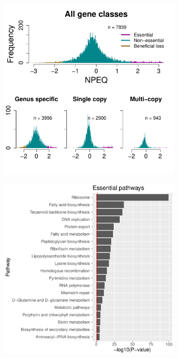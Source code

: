 \documentclass[12pt,letterpaper]{article}
\begin{document}
\begin{figure}
\captionsetup[subfigure]{justification=centering}
\begin{subfigure}{.5\textwidth}
  \centering
  \includegraphics[scale=0.4]{cluster-essentiality.pdf}
  \caption{}
  \label{fig:iidist}
\end{subfigure}%
\begin{subfigure}{.5\textwidth}
  \centering
  \includegraphics[scale=0.4]{essential-pathways.pdf}

\end{subfigure}
\end{figure}
\end{document}
